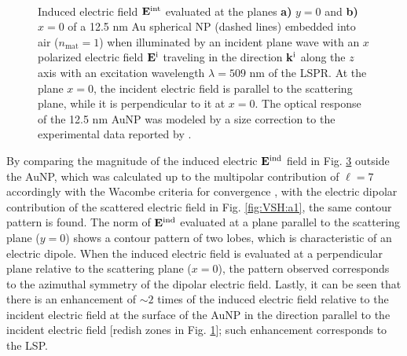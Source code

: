 \begin{figure}[t!]
	\def\svgwidth{\textwidth} \small\centering
		\vspace*{4.em}
		\hspace*{-.45\textwidth}
	\begin{subfigure}{.49\textwidth}%
		\caption{ } \label{fig:NearField:par}%
		\end{subfigure}%
	\begin{subfigure}{.49\textwidth}%
		\caption{ }\label{fig:NearField:perp}%
		\end{subfigure}%
	\vspace*{-7.em}\\
	\vspace*{-2em}
	\caption[Induced Electric Field of a 12.5 nm Au Spherical NP Embedded into Air at the LSPR]{Induced electric field $\vb{E}^\text{int}$ evaluated at the planes \textbf{a)} $y = 0$ and \textbf{b)} $x = 0$  of a 12.5 nm Au spherical NP (dashed lines) embedded into air ($n_\text{mat} = 1$) when illuminated by an incident plane wave with an $x$ polarized electric field $\vb{E}^\text{i}$ traveling in the direction $\vb{k}^\text{i}$ along the $z$ axis with an	 excitation wavelength $\lambda = 509$ nm of the LSPR. At the plane $x = 0$, the incident electric field is parallel to the scattering plane, while it is perpendicular to it at $x = 0$. The optical response of the 12.5 nm AuNP was modeled by a size correction to the experimental data reported by \citeauthor{johnson_optical_1972} \cite{johnson_optical_1972}.}
	\label{fig:NearField}
 \end{figure}

By comparing the magnitude of the induced electric $\vb{E}^\text{ind}$ field in Fig. \ref{fig:NearField} outside the AuNP, which was calculated up to  the multipolar contribution of $\ell = 7$ accordingly with the Wacombe criteria for convergence \cite{bohren_absorption_1983}, with the electric dipolar contribution of the scattered electric field in Fig. \ref{fig:VSH:a1}, the same contour pattern is found. The norm of $\vb{E}^\text{ind}$ evaluated at a plane parallel to the scattering plane ($y=0$) shows a contour pattern of two lobes, which is characteristic of an electric dipole. When the induced electric field is evaluated at a perpendicular plane relative to the scattering plane ($x = 0$), the pattern observed corresponds to the azimuthal symmetry of the dipolar electric field. Lastly, it can be seen that there is an enhancement of $\sim 2$ times of the induced electric field relative to the incident electric field at the surface of the AuNP in the direction parallel to the incident  electric field  [redish zones in Fig. \ref{fig:NearField:par}]; such enhancement corresponds to the LSP.

